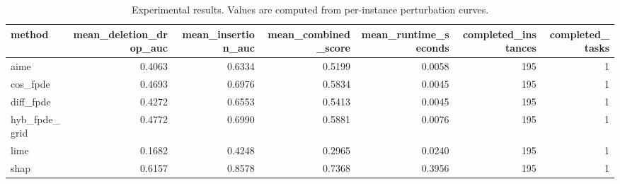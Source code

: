 \begin{table}[t]
\caption{Experimental results. Values are computed from per-instance perturbation curves.}
\label{tab:main_results_computed}
\centering
\begin{tabular}{lrrrrrr}
\toprule
method & mean\_deletion\_drop\_auc & mean\_insertion\_auc & mean\_combined\_score & mean\_runtime\_seconds & completed\_instances & completed\_tasks \\
\midrule
aime & 0.4063 & 0.6334 & 0.5199 & 0.0058 & 195 & 1 \\
cos\_fpde & 0.4693 & 0.6976 & 0.5834 & 0.0045 & 195 & 1 \\
diff\_fpde & 0.4272 & 0.6553 & 0.5413 & 0.0045 & 195 & 1 \\
hyb\_fpde\_grid & 0.4772 & 0.6990 & 0.5881 & 0.0076 & 195 & 1 \\
lime & 0.1682 & 0.4248 & 0.2965 & 0.0240 & 195 & 1 \\
shap & 0.6157 & 0.8578 & 0.7368 & 0.3956 & 195 & 1 \\
\bottomrule
\end{tabular}

\end{table}

